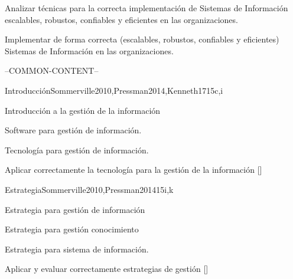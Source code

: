 \begin{syllabus}


\begin{justification}
Analizar técnicas para la correcta implementación de Sistemas de Información escalables, robustos, confiables y eficientes en las organizaciones.
\end{justification}

\begin{goals}
\item Implementar de forma correcta (escalables, robustos, confiables y eficientes) Sistemas de Información en las organizaciones.
\end{goals}

--COMMON-CONTENT--

\begin{unit}{Introducción}{}{Sommerville2010,Pressman2014,Kenneth17}{15}{c,i}
\begin{topics}
    \item Introducción a la gestión de la información
    \item Software para gestión de información.
    \item Tecnología para gestión de información.
\end{topics}
\begin{learningoutcomes}
    \item Aplicar correctamente la tecnología para la gestión de la información [\Assessment]
\end{learningoutcomes}
\end{unit}

\begin{unit}{Estrategia}{}{Sommerville2010,Pressman2014}{15}{i,k}
\begin{topics}
    \item Estrategia para gestión de información
    \item Estrategia para gestión conocimiento
    \item Estrategia para sistema de información.
\end{topics}
\begin{learningoutcomes}
    \item Aplicar y evaluar correctamente estrategias de gestión [\Assessment]
\end{learningoutcomes}
\end{unit}


\end{syllabus}
